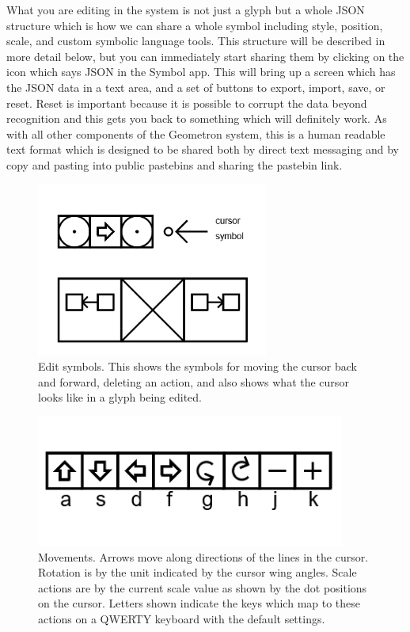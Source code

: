 What you are editing in the system is not just a glyph but a whole JSON structure which is how we can share a whole symbol including style, position, scale, and custom symbolic language tools.  This structure will be described in more detail below, but you can immediately start sharing them by clicking on the icon which says JSON in the Symbol app.  This will bring up a screen which has the JSON data in a text area, and a set of buttons to export, import, save, or reset.  Reset is important because it is possible to corrupt the data beyond recognition and this gets you back to something which will definitely work.  As with all other components of the Geometron system, this is a human readable text format which is designed to be shared both by direct text messaging and by copy and pasting into public pastebins and sharing the pastebin link.



\begin{figure}
	\centering
	\includegraphics[width=3in]{figures/web2d/cursoredit.png}
	\caption[cursoredit]
	{Edit symbols.  This shows the symbols for moving the cursor back and forward, deleting an action, and also shows what the cursor looks like in a glyph being edited.}
\end{figure}


\begin{figure}
	\centering
	\includegraphics[width=4in]{figures/web2d/move.png}
	\caption[move]
	{Movements.  Arrows move along directions of the lines in the cursor.  Rotation is by the unit indicated by the cursor wing angles. Scale actions are by the current scale value as shown by the dot positions on the cursor.  Letters shown indicate the keys which map to these actions on a QWERTY keyboard with the default settings.}
\end{figure}

